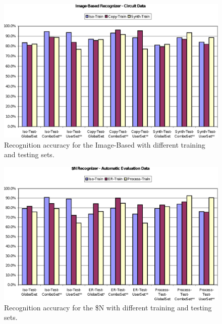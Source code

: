 \documentclass[final,5p,twocolumn]{elsarticle}
\begin{document}
\begin{figure}[p]
\begin{center}
\includegraphics[width=.9\hsize]{ImageRecoCircuitChart.eps}
\end{center}
\caption{Recognition accuracy for the Image-Based with different training and testing sets. }
\label{ImageRecoCircuit}
\end{figure}

\begin{figure}[p]
\begin{center}
\includegraphics[width=.9\hsize]{NDollarAutoChart.eps}
\end{center}
\caption{Recognition accuracy for the \$N with different training and testing sets. }
\label{NDollarAuto}
\end{figure}
\end{document}
